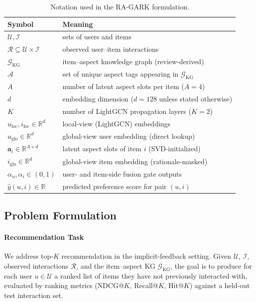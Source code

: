 \begin{table}[!htbp]
\centering
\caption{Notation used in the RA-GARK formulation.}
\label{tab:notation}
\begin{tabular}{ll}
\toprule
Symbol & Meaning \\
\midrule
$\mathcal{U}, \mathcal{I}$           & sets of users and items \\
$\mathcal{R} \subseteq \mathcal{U} \times \mathcal{I}$ & observed user--item interactions \\
$\mathcal{G}_{\mathrm{KG}}$          & item--aspect knowledge graph (review-derived) \\
$\mathcal{A}$                        & set of unique aspect tags appearing in $\mathcal{G}_{\mathrm{KG}}$ \\
$A$                                  & number of latent aspect slots per item ($A=4$) \\
$d$                                  & embedding dimension ($d=128$ unless stated otherwise) \\
$K$                                  & number of LightGCN propagation layers ($K=2$) \\
$u_{\mathrm{loc}}, i_{\mathrm{loc}} \in \mathbb{R}^d$ & local-view (LightGCN) embeddings \\
$u_{\mathrm{glo}} \in \mathbb{R}^d$   & global-view user embedding (direct lookup) \\
$\mathbf{a}_i \in \mathbb{R}^{A \times d}$ & latent aspect slots of item $i$ (SVD-initialized) \\
$i_{\mathrm{glo}} \in \mathbb{R}^d$    & global-view item embedding (rationale-masked) \\
$\alpha_u, \alpha_i \in (0,1)$        & user- and item-side fusion gate outputs \\
$\hat{y}(u, i) \in \mathbb{R}$         & predicted preference score for pair $(u, i)$ \\
\bottomrule
\end{tabular}
\end{table}
\FloatBarrier

\subsection{Problem Formulation}
\label{sec:approach-problem}

\paragraph{Recommendation Task} We address top-$K$ recommendation in the implicit-feedback setting. Given $\mathcal{U}$, $\mathcal{I}$, observed interactions $\mathcal{R}$, and the item--aspect KG $\mathcal{G}_{\mathrm{KG}}$, the goal is to produce for each user $u \in \mathcal{U}$ a ranked list of items they have not previously interacted with, evaluated by ranking metrics (NDCG@$K$, Recall@$K$, Hit@$K$) against a held-out test interaction set.

